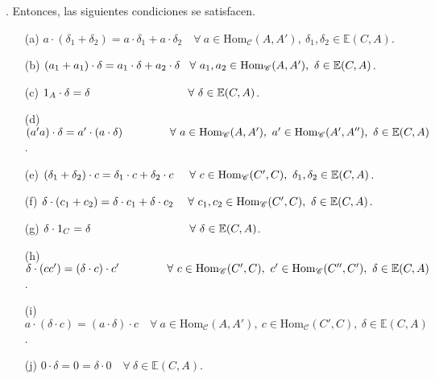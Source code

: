 \documentclass[preview]{standalone}
\begin{document}
\begin{center}
. Entonces, las siguientes condiciones se satisfacen. \begin{enumerate} \item[(a)] $a\cdot(\delta_1+\delta_2) = a\cdot\delta_1 + a\cdot\delta_2 \quad \forall \ a\in\text{Hom}_\mathscr{C}(A,A'), \ \delta_1,\delta_2\in\mathbb{E}(C,A)$. \item[(b)] $(a_1+a_1)\cdot\delta = a_1\cdot\delta + a_2\cdot\delta \quad \hspace{-0.5mm} \forall \ a_1,a_2\in\text{Hom}_\mathscr{C}(A,A'), \ \delta\in\mathbb{E}(C,A)$. \item[(c)] $1_A\cdot\delta = \delta \hspace{3.075cm} \forall \ \delta\in\mathbb{E}(C,A)$. \item[(d)] $(a'a)\cdot\delta = a'\cdot(a\cdot\delta) \hspace{1.5cm} \forall \ a\in\text{Hom}_\mathscr{C}(A,A'), \ a'\in\text{Hom}_\mathscr{C}(A',A''), \ \delta\in\mathbb{E}(C,A)$. \item[(e)] $(\delta_1+\delta_2)\cdot c = \delta_1\cdot c + \delta_2\cdot c \hspace{5mm} \forall \ c\in\text{Hom}_\mathscr{C}(C',C), \ \delta_1,\delta_2\in\mathbb{E}(C,A)$. \item[(f)] $\delta\cdot(c_1+c_2)=\delta\cdot c_1 + \delta\cdot c_2 \hspace{4.5mm} \forall \ c_1,c_2\in\text{Hom}_\mathscr{C}(C',C), \ \delta\in\mathbb{E}(C,A)$. \item[(g)] $\delta\cdot1_C  = \delta \hspace{3.085cm} \forall \ \delta\in\mathbb{E}(C,A)$. \item[(h)] $\delta\cdot(cc') = (\delta\cdot c)\cdot c' \hspace{1.5cm} \forall \ c\in\text{Hom}_\mathscr{C}(C',C), \ c'\in\text{Hom}_\mathscr{C}(C'',C'), \ \delta\in\mathbb{E}(C,A)$. \item[(i)] $a\cdot(\delta\cdot c) = (a\cdot\delta)\cdot c \quad \forall \ a\in\text{Hom}_\mathscr{C}(A,A'), \ c\in\text{Hom}_\mathscr{C}(C',C), \ \delta\in\mathbb{E}(C,A)$. \item[(j)] $0\cdot\delta = 0 = \delta\cdot0 \quad \forall \ \delta\in\mathbb{E}(C,A)$. \end{enumerate}
\end{center}
\end{document}
